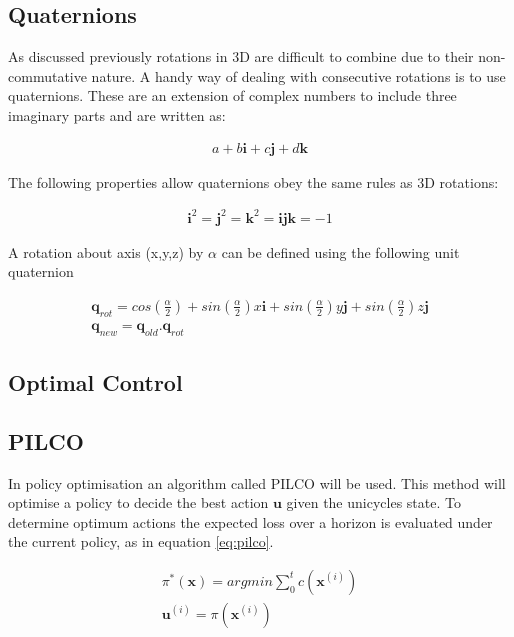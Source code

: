 \documentclass[twoside,twocolumn,12pt]{article}
\begin{document}
\subsection{Quaternions}
As discussed previously rotations in 3D are difficult to combine due to their non-commutative nature. A handy way of dealing with consecutive rotations is to use quaternions. These are an extension of complex numbers to include three imaginary parts and are written as:

\begin{align*}
a + b\textbf{i} + c\textbf{j} + d\textbf{k}
\end{align*}

The following properties allow quaternions obey the same rules as 3D rotations:

\begin{align*}
\textbf{i}^2 = \textbf{j}^2 = \textbf{k}^2 = \textbf{ijk} = -1
\end{align*}

A rotation about axis (x,y,z) by $\alpha$ can be defined using the following unit quaternion \cite{quat}

\begin{gather}
\textbf{q}_{rot} = cos(\frac{\alpha}{2}) + sin(\frac{\alpha}{2})x\textbf{i} + sin(\frac{\alpha}{2})y\textbf{j} + sin(\frac{\alpha}{2})z\textbf{j} \nonumber \\
\textbf{q}_{new} = \textbf{q}_{old} . \textbf{q}_{rot} \nonumber
\end{gather}

\subsection{Optimal Control}
 
 

\subsection{PILCO}
In policy optimisation an algorithm called PILCO \cite{pilco} will be used.
This method will optimise a policy to decide the best action $\textbf{u}$ given the unicycles state. To determine optimum actions the expected loss over a horizon is evaluated under the current policy, as in equation \ref{eq:pilco}.


\begin{equation}
\begin{split}
\pi^*(\textbf{x}) = argmin \sum_0^tc(\textbf{x}^{(i)}) \\
\textbf{u}^{(i)} = \pi(\textbf{x}^{(i)} )\\
\end{split}
\label{eq:pilco}
\end{equation}
\end{document}
